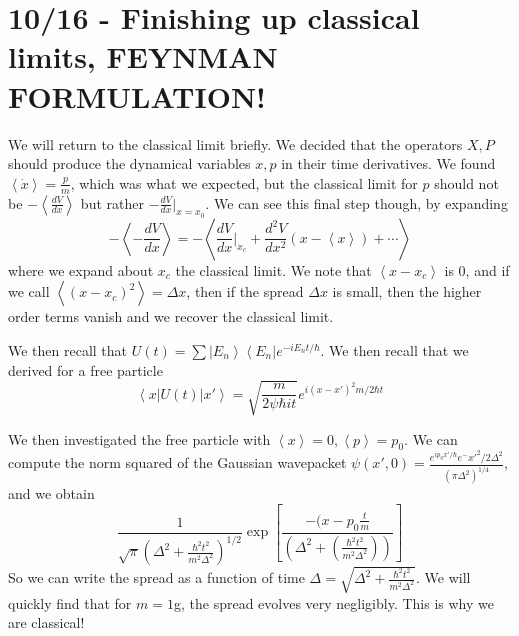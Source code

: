 \documentclass[10pt]{report}
\newcommand{\bra}[1]{\left<#1\right|}
\newcommand{\ket}[1]{\left|#1\right>}
\newcommand{\rd}[2]{\frac{d#1}{d#2}}
\newcommand{\expvalue}[1]{\left<#1\right>}
\begin{document}
\chapter{10/16 - Finishing up classical limits, FEYNMAN FORMULATION!}

We will return to the classical limit briefly. We decided that the operators $X,P$ should produce the dynamical variables $x,p$ in their time derivatives. We found $\expvalue{\dot{x}} = \frac{p}{m}$, which was what we expected, but the classical limit for $p$ should not be $-\expvalue{\rd{V}{x}}$ but rather $-\rd{V}{x}\Big|_{x=x_0}$. We can see this final step though, by expanding
$$-\expvalue{-\rd{V}{x}} = -\expvalue{\rd{V}{x}\Big|_{x_c} + \frac{d^2V}{dx^2}(x-\expvalue{x}) + \cdots}$$
where we expand about $x_c$ the classical limit. We note that $\expvalue{x-x_c}$ is $0$, and if we call $\expvalue{(x-x_c)^2} = \Delta x$, then if the spread $\Delta x$ is small, then the higher order terms vanish and we recover the classical limit.

We then recall that $U(t) = \sum \ket{E_n}\bra{E_n} e^{-iE_nt/\hbar}$. We then recall that we derived for a free particle
$$\bra{x}U(t)\ket{x'} = \sqrt{\frac{m}{2\psi \hbar it}} e^{i\left( x-x' \right)^2m/2\hbar t}$$

We then investigated the free particle with $\expvalue{x}=0,\expvalue{p}=p_0$. We can compute the norm squared of the Gaussian wavepacket $\psi(x',0) = \frac{e^{ip_0x'/\hbar}e^-x'^2/2\Delta^2}{\left( \pi\Delta^2 \right)^{1/4}}$, and we obtain
$$\frac{1}{\sqrt{\pi}\left( \Delta^2 + \frac{\hbar^2t^2}{m^2\Delta^2} \right)^{1/2}} \exp\left[ \frac{-(x-p_0\frac{t}{m}}{\left( \Delta^2 + \left( \frac{\hbar^2t^2}{m^2\Delta^2} \right) \right)} \right]$$
So we can write the spread as a function of time $\Delta = \sqrt{\Delta^2 + \frac{\hbar^2t^2}{m^2\Delta^2}}$. We will quickly find that for $m=1$g, the spread evolves very negligibly. This is why we are classical!
\end{document}
